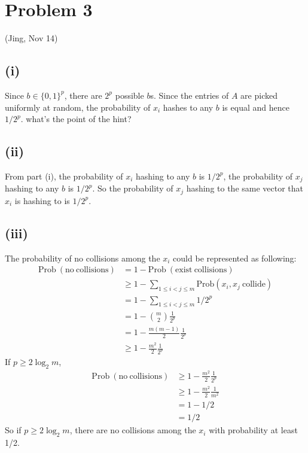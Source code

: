 \documentclass[twoside,11pt]{homework}
\date{\today} %
\begin{document}
\maketitle

\section*{Problem 3}
\color{blue} (Jing, Nov 14)
\color{black}
\subsection*{(i)}
Since $b \in \{0, 1\}^p$, there are $2^p$ possible $b$s.
Since the entries of $A$ are picked uniformly at random, the probability of $x_i$ hashes to any $b$ is equal and hence $1/2^p$.
\color{red} what's the point of the hint?
\color{black}

\subsection*{(ii)}
From part (i), the probability of $x_i$ hashing to any $b$ is $1/2^p$, the probability of $x_j$ hashing to any $b$ is $1/2^p$.
So the probability of $x_j$ hashing to the same vector that $x_i$ is hashing to is $1/2^p$.

\subsection*{(iii)}
The probability of no collisions among the $x_i$ could be represented as following:
%
\begin{equation}
\begin{split}
\mathrm{Prob\ (no\ collisions)} &= 1 - \mathrm{Prob\ (exist\ collisions)} \\
				       &\ge 1 - \sum\limits_{1\le i <j \le m} \mathrm{Prob}(x_i, x_j \mathrm{\ collide})\\
				       &= 1 -  \sum\limits_{1\le i <j \le m} 1/2^p \\
				       &= 1 - \binom{m}{2} \frac{1}{2^p} \\
				       &= 1- \frac{m(m-1)}{2}\frac{1}{2^p} \\
				       &\ge 1 - \frac{m^2}{2}\frac{1}{2^p}
\end{split}
\end{equation}
%
 If $p \ge 2 \log_2 m$,
\begin{equation}
\begin{split}
\mathrm{Prob\ (no\ collisions)} &\ge  1- \frac{m^2}{2}\frac{1}{2^p} \\
					&\ge 1 - \frac{m^2}{2} \frac{1}{m^2} \\
					&= 1 - 1/2 \\
					&= 1/2
\end{split}
\end{equation}
%
 So if  $p \ge 2 \log_2 m$, there are no collisions among the $x_i$ with probability at least 1/2.
 
\end{document}
